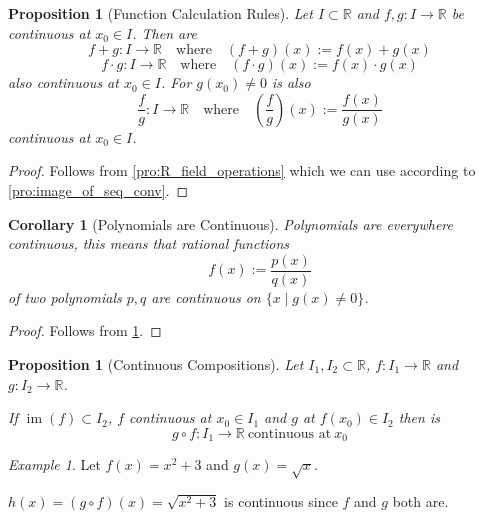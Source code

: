 \documentclass[english,titlepage]{uzhpub}
\DeclareMathOperator\im{im}
\theoremstyle{definition}
\theoremstyle{plain}
\newtheorem{proposition}[definition]{Proposition}
\newtheorem{corollary}{Corollary}[theorem]
\theoremstyle{remark}
\theoremstyle{example}
\newtheorem*{example}{Example}
\begin{document}
   \begin{proposition}[Function Calculation Rules]\label{pro:sequence_operations_for_functions}
      Let \(I \subset \mathbb{R}\) and \(f, g: I \to \mathbb{R}\) be continuous at \(x_0 \in I\). Then are
      \[f + g: I \to \mathbb{R} \quad\text{where}\quad (f + g)(x) := f(x) + g(x)\]
      \[f \cdot g: I \to \mathbb{R} \quad\text{where}\quad (f \cdot g)(x) := f(x) \cdot g(x)\]
      also continuous at \(x_0 \in I\).
      For \(g(x_0) \neq 0\) is also
      \[\frac{f}{g}: I \to \mathbb{R} \quad\text{where}\quad \left(\frac{f}{g}\right)(x) := \frac{f(x)}{g(x)}\]
      continuous at \(x_0 \in I\).
   \end{proposition}
   \begin{proof}
      Follows from \cref{pro:R_field_operations} which we can use according to \cref{pro:image_of_seq_conv}.
   \end{proof}

   \begin{corollary}[Polynomials are Continuous]
      Polynomials are everywhere continuous, this means that \textit{rational functions}
      \[f(x) := \frac{p(x)}{q(x)}\]
      of two polynomials \(p, q\) are continuous on \(\{x \mid g(x) \neq 0\}\).
   \end{corollary}
   \begin{proof}
      Follows from \cref{pro:sequence_operations_for_functions}.
   \end{proof}

   \begin{proposition}[Continuous Compositions]\label{pro:contin_continuation}
      Let \(I_1, I_2 \subset \mathbb{R}\), \(f: I_1 \to \mathbb{R}\) and \(g: I_2 \to \mathbb{R}\).

      If \(\im(f) \subset I_2\), \(f\) continuous at \(x_0 \in I_1\) and \(g\) at \(f(x_0) \in I_2\) then is
      \[g \circ f: I_1 \to \mathbb{R}~\text{continuous at}~x_0\]
   \end{proposition}
   \begin{example}
      Let \(f(x) = x^2 + 3\) and \(g(x) = \sqrt{x}\).

      \(h(x) = (g \circ f)(x) = \sqrt{x^2 + 3}\) is continuous since \(f\) and \(g\) both are.
   \end{example}
\end{document}
